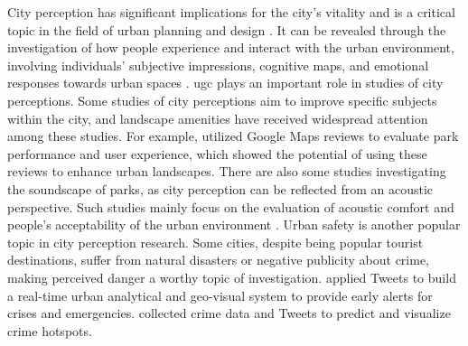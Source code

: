 \documentclass{article}
\theoremstyle{remark}
\begin{document}
City perception has significant implications for the city's vitality and is a critical topic in the field of urban planning and design \citep{jacobs_death_1961}. It can be revealed through the investigation of how people experience and interact with the urban environment, involving individuals' subjective impressions, cognitive maps, and emotional responses towards urban spaces \citep{lynch_image_1960}. \acrshort{ugc} plays an important role in studies of city perceptions. Some studies of city perceptions aim to improve specific subjects within the city, and landscape amenities have received widespread attention among these studies. For example, \cite{huang_user_2022} utilized Google Maps reviews to evaluate park performance and user experience, which showed the potential of using these reviews to enhance urban landscapes. There are also some studies investigating the soundscape of parks, as city perception can be reflected from an acoustic perspective. Such studies mainly focus on the evaluation of acoustic comfort and people's acceptability of the urban environment \citep{tse_perception_2012, liu_effects_2014}. Urban safety is another popular topic in city perception research. Some cities, despite being popular tourist destinations, suffer from natural disasters or negative publicity about crime, making perceived danger a worthy topic of investigation. \cite{yao_towards_2020} applied Tweets to build a real-time urban analytical and geo-visual system to provide early alerts for crises and emergencies. \cite{yang_crimetelescope_2018} collected crime data and Tweets to predict and visualize crime hotspots.
\end{document}
